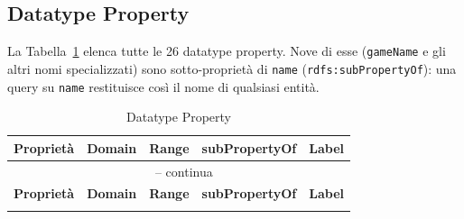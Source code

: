 \subsection{Datatype Property}

La Tabella~\ref{tab:dataprop} elenca tutte le 26 datatype property. Nove di esse
(\texttt{gameName} e gli altri nomi specializzati) sono sotto-propriet\`a di
\texttt{name} (\texttt{rdfs:subPropertyOf}): una query su \texttt{name} restituisce cos\`i
il nome di qualsiasi entit\`a.

\begin{longtable}{lllll}
\caption{Datatype Property}\label{tab:dataprop}\\
\toprule
\textbf{Propriet\`a}      & \textbf{Domain} & \textbf{Range}   & \textbf{subPropertyOf} & \textbf{Label} \\
\midrule
\endfirsthead
\multicolumn{5}{c}{\tablename\ \thetable{} -- continua} \\
\toprule
\textbf{Propriet\`a}      & \textbf{Domain} & \textbf{Range}   & \textbf{subPropertyOf} & \textbf{Label} \\
\midrule
\endhead
\bottomrule
\endlastfoot


\end{longtable}
